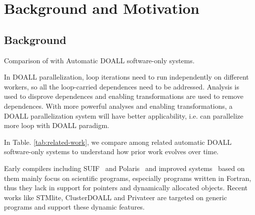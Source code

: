 \section{Background and Motivation}
\label{sec:motivation}

\subsection{Background}



\begin{table*}[!ht]
  
  \caption{
    Comparison of \name with Automatic DOALL software-only systems.
  }
  \label{tab:related-work}
    \vspace{-5pt}
\end{table*}


In DOALL parallelization, loop iterations need to run independently on
different workers, so all the loop-carried dependences need to be
addressed. Analysis is used to disprove dependences and enabling
transformations are used to remove dependences. With more powerful analyses
and enabling transformations, a DOALL parallelization system will have
better applicability, i.e. can parallelize more loop with DOALL paradigm.

In Table. \ref{tab:related-work}, we compare among related automatic DOALL
software-only systems to understand how prior work evolves over time.

Early compilers including SUIF~\cite{blume:96:icpp} and
Polaris~\cite{suif:94:stanford} and improved
systems~\cite{Rus:07:ics,rus:03:hybrid,rauchwerger:99:pds} based on them
mainly focus on scientific programs, especially programs written in
Fortran, thus they lack in support for pointers and dynamically allocated
objects.
%
Recent works like STMlite\cite{mehrara:09:stmlite},
ClusterDOALL\cite{kim:12:cgo} and Privateer\cite{johnson:12:pldi} are
targeted on generic programs and support these dynamic features.

